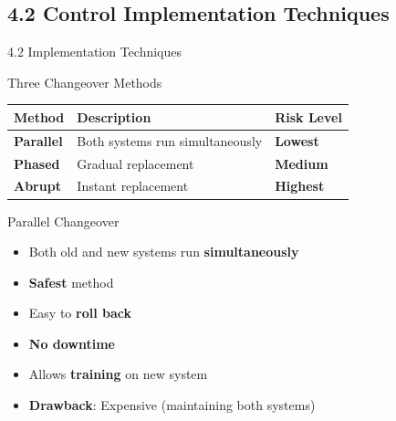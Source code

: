 \documentclass{beamer}
\begin{document}
	\subsection{4.2 Control Implementation Techniques}
	\begin{frame}{4.2 Implementation Techniques}
		\begin{block}{Three Changeover Methods}
			\begin{tabular}{|p{2.5cm}|p{4cm}|p{4.5cm}|}
				\hline
				\textbf{Method} & \textbf{Description} & \textbf{Risk Level} \\
				\hline
				\textbf{Parallel} & Both systems run simultaneously & \textbf{Lowest} \\
				\hline
				\textbf{Phased} & Gradual replacement & \textbf{Medium} \\
				\hline
				\textbf{Abrupt} & Instant replacement & \textbf{Highest} \\
				\hline
			\end{tabular}
		\end{block}
		
		\begin{block}{Parallel Changeover}
			\begin{itemize}
				\item Both old and new systems run \textbf{simultaneously}
				\item \textbf{Safest} method
				\item Easy to \textbf{roll back}
				\item \textbf{No downtime}
				\item Allows \textbf{training} on new system
				\item \textbf{Drawback}: Expensive (maintaining both systems)
			\end{itemize}
		\end{block}
	\end{frame}
	
\end{document}
